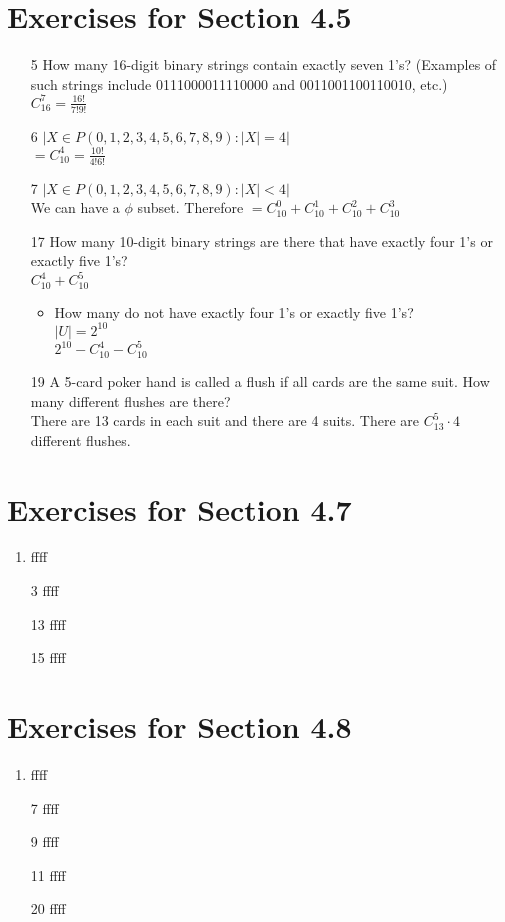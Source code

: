 \documentclass[12pt]{article}
\begin{document}
\section*{Exercises for Section 4.5}
\begin{enumerate}
    \item [5] How many 16-digit binary strings contain exactly seven 1’s? (Examples of such
strings include 0111000011110000 and 0011001100110010, etc.)\\
	$C_{16}^7 = \frac{16!}{7!9!}$
    \item [6] $|{X \in P({0,1,2,3,4,5,6,7,8,9}): |X| = 4}|$\\
	$= C_{10}^4 = \frac{10!}{4!6!}$
    \item [7] $|{X \in P({0,1,2,3,4,5,6,7,8,9}): |X| < 4}|$\\
	We can have a $\phi$ subset. Therefore $= C_{10}^0 + C_{10}^1 + C_{10}^2 + C_{10}^3$
    \item [17] How many 10-digit binary strings are there that have exactly four 1’s or exactly
five 1’s?\\
	$C_{10}^4 + C_{10}^5$
	\begin{itemize}
	    \item How many do not have exactly four 1’s or exactly five 1’s?\\
		$|U| = 2^{10}$\\
		$2^{10} - C_{10}^4 - C_{10}^5$
	\end{itemize}
    \item [19] A 5-card poker hand is called a flush if all cards are the same suit. How many
different flushes are there?\\
	There are 13 cards in each suit and there are 4 suits. There are $C_{13}^5 \cdot 4$ different flushes.
\end{enumerate}
\section*{Exercises for Section 4.7}
\begin{enumerate}
    \item ffff
    \item [3] ffff
    \item [13] ffff
    \item [15] ffff
\end{enumerate}
\section*{Exercises for Section 4.8}
\begin{enumerate}
    \item ffff
    \item [7] ffff
    \item [9] ffff
    \item [11] ffff
    \item [20] ffff
\end{enumerate}
\end{document}
